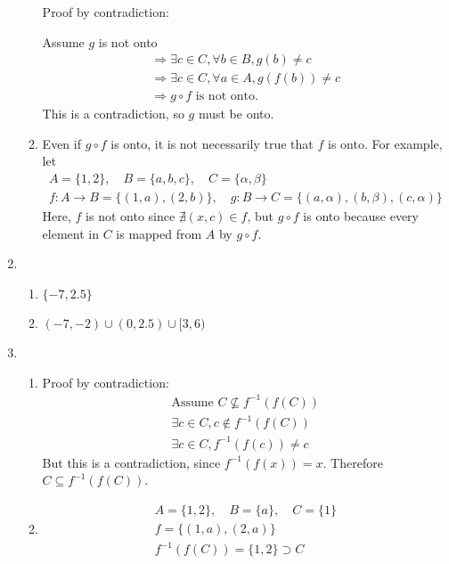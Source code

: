 \documentclass[fleqn]{article}
\begin{document}
\begin{enumerate}
\begin{enumerate}
		Proof by contradiction:

		Assume \(g\) is not onto
		\begin{gather*}
			\Rightarrow \exists c \in C, \forall b \in B, g(b) \neq c \\
			\Rightarrow \exists c \in C, \forall a \in A, g(f(b)) \neq c \\
			\Rightarrow g \circ f \text{ is not onto.}
		\end{gather*}
		This is a contradiction, so \(g\) must be onto.

		\item[(c)]
		Even if \(g \circ f\) is onto, it is not necessarily true that \(f\) is onto. For example, let 
		\begin{gather*}
			A = \{1, 2\}, \quad B = \{a, b, c\}, \quad C = \{\alpha, \beta\} \\
			f:A \to B = \{(1, a), (2, b)\}, \quad g:B \to C = \{(a, \alpha), (b, \beta), (c, \alpha)\}
		\end{gather*}
		Here, \(f\) is not onto since \(\nexists (x, c) \in f\), but \(g \circ f\) is onto because every element in \(C\) is mapped from \(A\) by \(g \circ f\).
	\end{enumerate}

	\item[8.]
	\begin{enumerate}
		\item[(a)]
		\(\{-7, 2.5\}\)
		\item[(c)]
		\((-7, -2) \cup (0, 2.5) \cup [3, 6)\)
	\end{enumerate}

	\item[9.]
	\begin{enumerate}
		\item %
		Proof by contradiction:
		\begin{gather*}
			\text{Assume } C \nsubseteq f^{-1}(f(C)) \\
			\exists c \in C, c \notin f^{-1}(f(C)) \\
			\exists c \in C, f^{-1}(f(c)) \neq c
		\end{gather*}
		But this is a contradiction, since \(f^{-1}(f(x)) = x\). Therefore \(C \subseteq f^{-1}(f(C))\).
		
		\item %
		\begin{gather*}
			A = \{1, 2\}, \quad B = \{a\}, \quad C = \{1\} \\
			f = \{(1, a), (2, a)\} \\
			f^{-1}(f(C)) = \{1, 2\} \supset C
		\end{gather*}
	\end{enumerate}


\end{enumerate}
\end{document}

